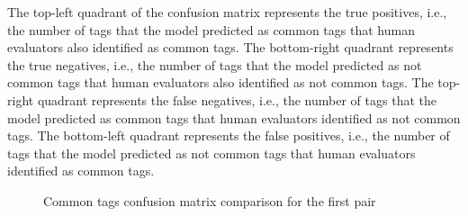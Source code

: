 The top-left quadrant of the confusion matrix represents the true positives, i.e., the number of tags that the model predicted as common tags that human evaluators also identified as common tags. The bottom-right quadrant represents the true negatives, i.e., the number of tags that the model predicted as not common tags that human evaluators also identified as not common tags. The top-right quadrant represents the false negatives, i.e., the number of tags that the model predicted as common tags that human evaluators identified as not common tags. The bottom-left quadrant represents the false positives, i.e., the number of tags that the model predicted as not common tags that human evaluators identified as common tags.

\begin{figure}[h]
    \centering
    \hfill

    \caption{Common tags confusion matrix comparison for the first pair}
    \label{fig:first_pair_common_tags_confusion_matrix}
\end{figure}

